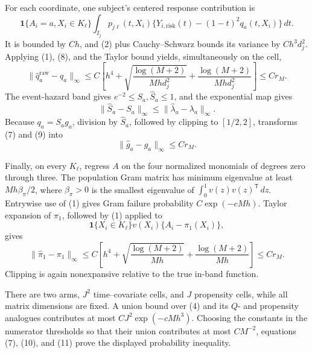For each coordinate, one subject's centered response contribution is
\[
\mathbf 1\{A_i=a,X_i\in K_\ell\}\int_{I_j}p_{j\ell}(t,X_i)
\{Y_{i,\mathrm{risk}}(t)-(1-t)^2q_a(t,X_i)\}\,dt.
\]
It is bounded by \(Ch\), and (2) plus Cauchy--Schwarz bounds its variance by \(Ch^3d_j^2\). Applying (1), (8), and the Taylor bound yields, simultaneously on the cell,
\[
\lVert\widehat q_a^{\mathrm{raw}}-q_a\rVert_\infty
\le C\left[h^4+\sqrt{\frac{\log(M+2)}{Mhd_j^2}}
+\frac{\log(M+2)}{Mhd_j^2}\right]
\le Cr_M. \tag{9}
\]
The event-hazard band gives \(e^{-2}\le S_a,\widehat S_a\le1\), and the exponential map gives
\[
\lVert\widehat S_a-S_a\rVert_\infty
\le\lVert\widehat\lambda_a-\lambda_a\rVert_\infty.
\]
Because \(q_a=S_ag_a\), division by \(\widehat S_a\), followed by clipping to \([1/2,2]\), transforms (7) and (9) into
\[
\lVert\widehat g_a-g_a\rVert_\infty\le Cr_M. \tag{10}
\]

Finally, on every \(K_\ell\), regress \(A\) on the four normalized monomials of degrees zero through three. The population Gram matrix has minimum eigenvalue at least \(Mh\beta_\pi/2\), where \(\beta_\pi>0\) is the smallest eigenvalue of \(\int_0^1v(z)v(z)^{\mathsf T}\,dz\). Entrywise use of (1) gives Gram failure probability \(C\exp(-cMh)\). Taylor expansion of \(\pi_1\), followed by (1) applied to
\[
\mathbf 1\{X_i\in K_\ell\}v(X_i)\{A_i-\pi_1(X_i)\},
\]
gives
\[
\lVert\widehat\pi_1-\pi_1\rVert_\infty
\le C\left[h^4+\sqrt{\frac{\log(M+2)}{Mh}}
+\frac{\log(M+2)}{Mh}\right]
\le Cr_M. \tag{11}
\]
Clipping is again nonexpansive relative to the true in-band function.

There are two arms, \(J^2\) time--covariate cells, and \(J\) propensity cells, while all matrix dimensions are fixed. A union bound over (4) and its \(Q\)- and propensity analogues contributes at most \(CJ^2\exp(-cMh^3)\). Choosing the constants in the numerator thresholds so that their union contributes at most \(CM^{-2}\), equations (7), (10), and (11) prove the displayed probability inequality.

